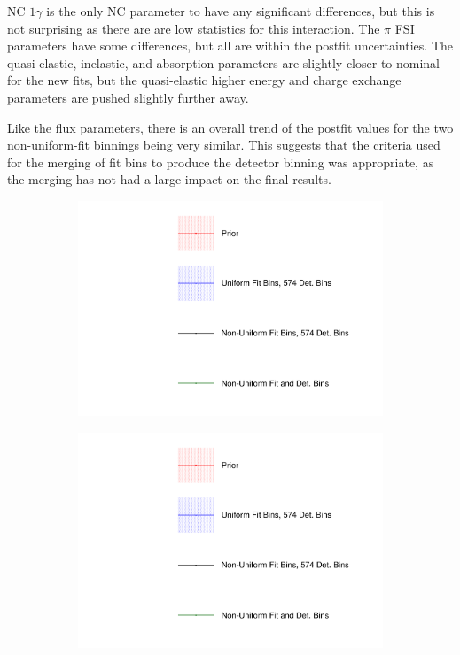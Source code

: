 NC $1\gamma$ is the only NC parameter to have any significant differences, but this is not surprising as there are are low statistics for this interaction. The $\pi$ FSI parameters have some differences, but all are within the postfit uncertainties. The quasi-elastic, inelastic, and absorption parameters are slightly closer to nominal for the new fits, but the quasi-elastic higher energy and charge exchange parameters are pushed slightly further away.

Like the flux parameters, there is an overall trend of the postfit values for the two non-uniform-fit binnings being very similar. This suggests that the criteria used for the merging of fit bins to produce the detector binning was appropriate, as the merging has not had a large impact on the final results. 

\begin{figure}
\centering
\begin{subfigure}{0.3\textwidth}
  \centering
  \includegraphics[width=1.0\linewidth,  trim={5mm  80mm 0mm 0mm}, clip]{figs/polyasmvs_leg}
\end{subfigure}
\begin{subfigure}{0.3\textwidth}
  \centering
  \includegraphics[width=1.0\linewidth,  trim={5mm  0mm 0mm 95mm}, clip]{figs/polyasmvs_leg}

\end{subfigure}
\end{figure}
